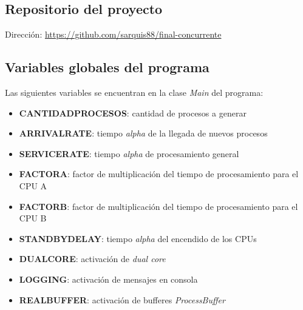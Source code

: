 \documentclass{article}
\begin{document}
    \subsection{Repositorio del proyecto} \noindent
    Dirección: \url{https://github.com/sarquis88/final-concurrente}
    \subsection{Variables globales del programa} \noindent
    Las siguientes variables se encuentran en la clase \emph{Main} del programa:
    \begin{itemize}
        \item \textbf{CANTIDADPROCESOS}: cantidad de procesos a generar 
        \item \textbf{ARRIVALRATE}: tiempo \emph{alpha} de la llegada de nuevos procesos
        \item \textbf{SERVICERATE}: tiempo \emph{alpha} de procesamiento general
        \item \textbf{FACTORA}: factor de multiplicación del tiempo de procesamiento para el
        CPU A
        \item \textbf{FACTORB}: factor de multiplicación del tiempo de procesamiento para el
        CPU B
        \item \textbf{STANDBYDELAY}: tiempo \emph{alpha} del encendido de los CPUs
        \item \textbf{DUALCORE}: activación de \emph{dual core}
        \item \textbf{LOGGING}: activación de mensajes en consola
        \item \textbf{REALBUFFER}: activación de bufferes \emph{ProcessBuffer}
    \end{itemize}
\end{document}
